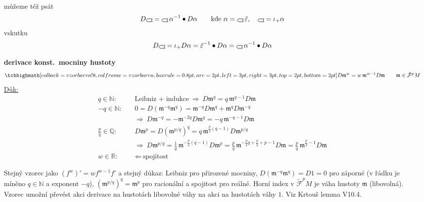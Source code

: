 můžeme též psát
\[
  D\gmIhustsym = \gmIhustsym\,\alpha^{-1}\bullet D\alpha \qquad\text{kde } \alpha = \gmIhustsym\,\tilde\varepsilon,\quad \gmIhustsym = \iota_+\alpha
\]
vskutku
\[
  D\gmIhustsym = \iota_+D\alpha = \tilde\varepsilon^{-1}\bullet D\alpha = \gmIhustsym\,\alpha^{-1}\bullet D\alpha
\]

\textbf{derivace konst.\ mocniny hustoty}
\[
  \vzorec{D\mathfrak{m}^w = w\,\mathfrak{m}^{w-1}D\mathfrak{m}} \qquad \mathfrak{m}\in\tilde{\mathcal{F}}^pM
\]
\underline{Důk:}
\begin{align*}
  q\in\mathbb{N}:&\quad \text{Leibniz + indukce} \ \Rightarrow\ D\mathfrak{m}^q = q\,\mathfrak{m}^{q-1}D\mathfrak{m} \\
  -q\in\mathbb{N}:&\quad 0 = D(\mathfrak{m}^{-q}\mathfrak{m}^q) = \mathfrak{m}^{-q}D\mathfrak{m}^q + \mathfrak{m}^qD\mathfrak{m}^{-q} \\
  &\quad\Rightarrow\ D\mathfrak{m}^{-q} = -\mathfrak{m}^{-2q}D\mathfrak{m}^q = -q\,\mathfrak{m}^{-q-1}D\mathfrak{m} \\
  \tfrac pq\in\mathbb{Q}:&\quad D\mathfrak{m}^p = D(\mathfrak{m}^{p/q})^q = q\,\mathfrak{m}^{\frac pq(q-1)}D\mathfrak{m}^{p/q} \\
  &\quad\Rightarrow\ D\mathfrak{m}^{p/q} = \frac1q\,\mathfrak{m}^{-\frac pq(q-1)}D\mathfrak{m}^p
   = \frac pq\,\mathfrak{m}^{-\frac pq q+\frac pq+p-1}D\mathfrak{m} = \frac pq\,\mathfrak{m}^{\frac pq-1}D\mathfrak{m} \\
  w\in\mathbb{R}:&\quad \Leftarrow\ \text{spojitost}
\end{align*}

\begin{vysvetleni}
Stejný vzorec jako $(f^w)' = wf^{w-1}f'$ a stejný důkaz: Leibniz pro přirozené mocniny, $D(\mathfrak m^{-q}\mathfrak m^q) = D1 = 0$ pro záporné
(v řádku  je míněno $q\in\mathbb{N}$ a exponent $-q$), $(\mathfrak m^{p/q})^q = \mathfrak m^p$ pro racionální a spojitost pro reálné.
Horní index v $\tilde{\mathcal F}^pM$ je váha hustoty $\mathfrak m$ (libovolná). Vzorec umožní převést akci derivace na hustotách libovolné váhy
na akci na hustotách váhy $1$. Viz Krtouš lemma V10.4.
\end{vysvetleni}

